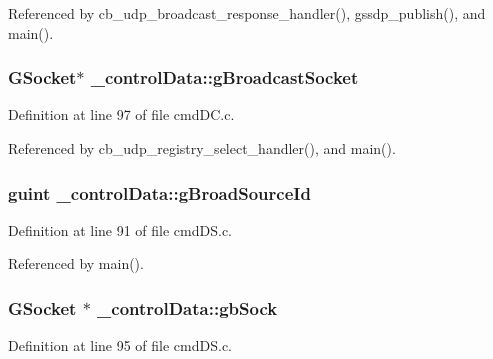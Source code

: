 Referenced by cb\+\_\+udp\+\_\+broadcast\+\_\+response\+\_\+handler(), gssdp\+\_\+publish(), and main().

\hypertarget{struct__control_data_a05fab30fce92ebe541d9dd98220c60ef}{
\subsubsection[{g\+Broadcast\+Socket}]{\setlength{\rightskip}{0pt plus 5cm}G\+Socket$\ast$ \+\_\+control\+Data\+::g\+Broadcast\+Socket}}\label{struct__control_data_a05fab30fce92ebe541d9dd98220c60ef}


Definition at line 97 of file cmd\+D\+C.\+c.



Referenced by cb\+\_\+udp\+\_\+registry\+\_\+select\+\_\+handler(), and main().

\hypertarget{struct__control_data_ae9e5e76959a76812d94ee8f83ae2eef5}{
\subsubsection[{g\+Broad\+Source\+Id}]{\setlength{\rightskip}{0pt plus 5cm}guint \+\_\+control\+Data\+::g\+Broad\+Source\+Id}}\label{struct__control_data_ae9e5e76959a76812d94ee8f83ae2eef5}


Definition at line 91 of file cmd\+D\+S.\+c.



Referenced by main().

\hypertarget{struct__control_data_a3023250e01849cb311a7207746a3b64e}{
\subsubsection[{gb\+Sock}]{\setlength{\rightskip}{0pt plus 5cm}G\+Socket $\ast$ \+\_\+control\+Data\+::gb\+Sock}}\label{struct__control_data_a3023250e01849cb311a7207746a3b64e}


Definition at line 95 of file cmd\+D\+S.\+c.



